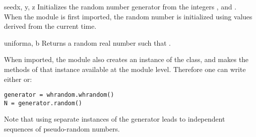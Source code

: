 \begin{funcdesc}{seed}{x, y, z}
Initializes the random number generator from the integers ,
 and .  When the module is first imported, the random
number is initialized using values derived from the current time.
\end{funcdesc}

\begin{funcdesc}{uniform}{a, b}
Returns a random real number  such that .
\end{funcdesc}

When imported, the  module also creates an instance of
the  class, and makes the methods of that instance
available at the module level.  Therefore one can write either 
 or:

\begin{verbatim}
generator = whrandom.whrandom()
N = generator.random()
\end{verbatim}

Note that using separate instances of the generator leads to
independent sequences of pseudo-random numbers.

\begin{seealso}
\end{seealso}
